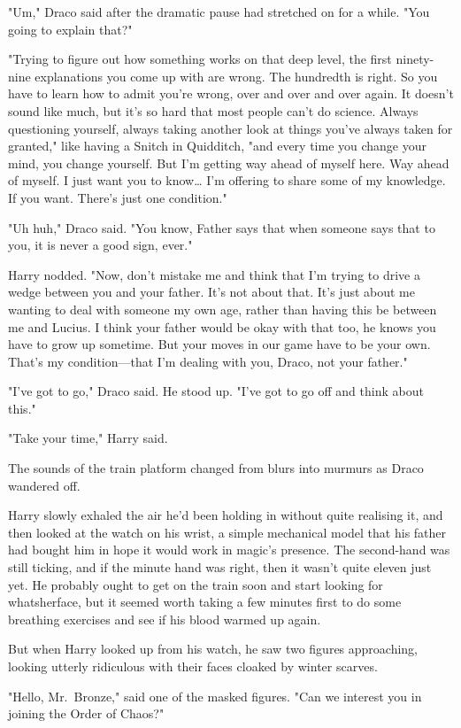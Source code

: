"Um," Draco said after the dramatic pause had stretched on for a while. "You
going to explain that?"

"Trying to figure out how something works on that deep level, the first
ninety-nine explanations you come up with are wrong. The hundredth is right. So
you have to learn how to admit you're wrong, over and over and over again. It
doesn't sound like much, but it's so hard that most people can't do science.
Always questioning yourself, always taking another look at things you've always
taken for granted," like having a Snitch in Quidditch, "and every time you
change your mind, you change yourself. But I'm getting way ahead of myself
here. Way ahead of myself. I just want you to know{\ldots} I'm offering to
share some of my knowledge. If you want. There's just one condition."

"Uh huh," Draco said. "You know, Father says that when someone says that to
you, it is never a good sign, ever."

Harry nodded. "Now, don't mistake me and think that I'm trying to drive a wedge
between you and your father. It's not about that. It's just about me wanting to
deal with someone my own age, rather than having this be between me and Lucius.
I think your father would be okay with that too, he knows you have to grow up
sometime. But your moves in our game have to be your own. That's my
condition---that I'm dealing with you, Draco, not your father."

"I've got to go," Draco said. He stood up. "I've got to go off and think about
this."

"Take your time," Harry said.

The sounds of the train platform changed from blurs into murmurs as Draco
wandered off.

Harry slowly exhaled the air he'd been holding in without quite realising it,
and then looked at the watch on his wrist, a simple mechanical model that his
father had bought him in hope it would work in magic's presence. The
second-hand was still ticking, and if the minute hand was right, then it wasn't
quite eleven just yet. He probably ought to get on the train soon and start
looking for whatsherface, but it seemed worth taking a few minutes first to do
some breathing exercises and see if his blood warmed up again.

But when Harry looked up from his watch, he saw two figures approaching,
looking utterly ridiculous with their faces cloaked by winter scarves.

"Hello, Mr.~Bronze," said one of the masked figures. "Can we interest you in
joining the Order of Chaos?"

